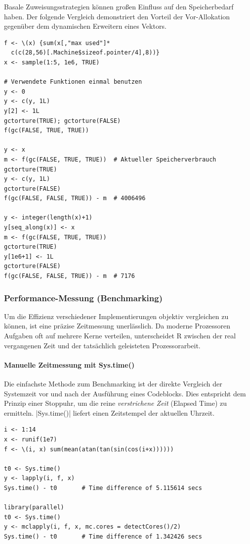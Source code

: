 \documentclass[10pt,twocolumn]{scrartcl}
\renewcommand{\lstinline}{\mycoloredinline}
\begin{document}
Basale Zuweisungsstrategien können großen Einfluss auf den Speicherbedarf haben. Der folgende Vergleich demonstriert den Vorteil der Vor-Allokation gegenüber dem dynamischen Erweitern eines Vektors.

\begin{lstlisting}
f <- \(x) {sum(x[,"max used"]*
  c(c(28,56)[.Machine$sizeof.pointer/4],8))}
x <- sample(1:5, 1e6, TRUE)

# Verwendete Funktionen einmal benutzen
y <- 0
y <- c(y, 1L)
y[2] <- 1L
gctorture(TRUE); gctorture(FALSE)
f(gc(FALSE, TRUE, TRUE))

y <- x
m <- f(gc(FALSE, TRUE, TRUE))  # Aktueller Speicherverbrauch
gctorture(TRUE)
y <- c(y, 1L)
gctorture(FALSE)
f(gc(FALSE, FALSE, TRUE)) - m  # 4006496

y <- integer(length(x)+1)
y[seq_along(x)] <- x
m <- f(gc(FALSE, TRUE, TRUE))
gctorture(TRUE)
y[1e6+1] <- 1L
gctorture(FALSE)
f(gc(FALSE, FALSE, TRUE)) - m  # 7176
\end{lstlisting}


\subsubsection{Performance-Messung (Benchmarking)}

Um die Effizienz verschiedener Implementierungen objektiv vergleichen zu können, ist eine präzise Zeitmessung unerlässlich. Da moderne Prozessoren Aufgaben oft auf mehrere Kerne verteilen, unterscheidet R zwischen der real vergangenen Zeit und der tatsächlich geleisteten Prozessorarbeit.


\paragraph{Manuelle Zeitmessung mit Sys.time()}

Die einfachste Methode zum Benchmarking ist der direkte Vergleich der Systemzeit vor und nach der Ausführung eines Codeblocks. Dies entspricht dem Prinzip einer Stoppuhr, um die reine \emph{verstrichene Zeit} (Elapsed Time) zu ermitteln. \lstinline|Sys.time()| liefert einen Zeitstempel der aktuellen Uhrzeit.

\begin{lstlisting}
i <- 1:14
x <- runif(1e7)
f <- \(i, x) sum(mean(atan(tan(sin(cos(i+x))))))

t0 <- Sys.time()
y <- lapply(i, f, x)
Sys.time() - t0       # Time difference of 5.115614 secs

library(parallel)
t0 <- Sys.time()
y <- mclapply(i, f, x, mc.cores = detectCores()/2)
Sys.time() - t0       # Time difference of 1.342426 secs
\end{lstlisting}
\end{document}
